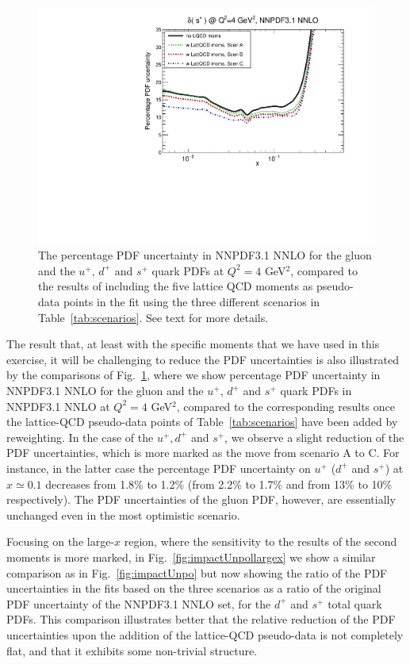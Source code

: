 \begin{figure}[!t]
\includegraphics[scale=0.45]{plots/xsp-unpol-lattice-relerr.pdf}
\caption{\small The percentage PDF uncertainty in NNPDF3.1 NNLO
  for the gluon and the $u^+$, $d^+$ and $s^+$ quark PDFs at
  $Q^2=4$ GeV$^2$,
  compared to the results of including the five lattice
  QCD moments as pseudo-data points in the fit using the three
  different scenarios in  Table~\ref{tab:scenarios}.
See text for more details.
}    
\label{fig:impactUnpol}
\end{figure}

The result that, at least with the specific moments that we have used
in this exercise, it will be challenging to reduce the
PDF uncertainties is also illustrated by the comparisons of 
 Fig.~\ref{fig:impactUnpol}, where we show
percentage PDF uncertainty in NNPDF3.1 NNLO
for the gluon and the $u^+$, $d^+$ and $s^+$ quark PDFs in NNPDF3.1 NNLO
at $Q^2=4$ GeV$^2$,
compared to the corresponding results once
the lattice-QCD pseudo-data points of Table~\ref{tab:scenarios} have
been added by reweighting.
In the case of the $u^+,d^+$ and $s^+$, we observe a slight reduction
of the PDF uncertainties, which is more marked as the move
from scenario A to C.
%
For instance, in the latter case the percentage PDF
uncertainty on $u^+$ ($d^+$ and $s^+$) at $x\simeq 0.1$
decreases from 1.8\% to 1.2\% (from 2.2\% to 1.7\% and from 13\% to 10\% respectively).
%
The PDF uncertainties of the gluon PDF, however,
are essentially unchanged even in the most optimistic scenario.

Focusing on the large-$x$ region, where the sensitivity to the
results of the second moments is more marked, in
Fig.~\ref{fig:impactUnpollargex} we show a similar comparison
as in Fig.~\ref{fig:impactUnpo} but now showing the ratio of the
  PDF uncertainties in the fits based on the three scenarios
  as a ratio of the original
  PDF uncertainty of the NNPDF3.1 NNLO set, for the $d^+$
  and $s^+$ total quark PDFs.
  This comparison illustrates better that the relative reduction
  of the PDF uncertainties upon the addition of the lattice-QCD
  pseudo-data is not completely flat, and that it exhibits some
  non-trivial structure.


